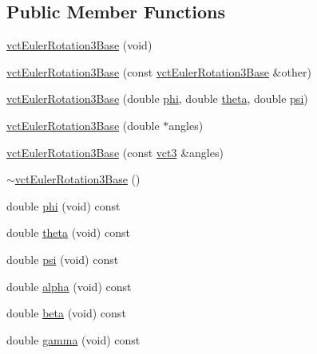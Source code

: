 \subsection*{Public Member Functions}
\begin{DoxyCompactItemize}
\item 
\hyperlink{classvct_euler_rotation3_base_ae1f9e5e19f7cdcc730e654a6fb6e8eac}{vct\-Euler\-Rotation3\-Base} (void)
\item 
\hyperlink{classvct_euler_rotation3_base_addcff20799832d83b777e33cd7291da4}{vct\-Euler\-Rotation3\-Base} (const \hyperlink{classvct_euler_rotation3_base}{vct\-Euler\-Rotation3\-Base} \&other)
\item 
\hyperlink{classvct_euler_rotation3_base_a0c71f3b2255a2eb4027161881b88771a}{vct\-Euler\-Rotation3\-Base} (double \hyperlink{classvct_euler_rotation3_base_af2e807e479e504cd47c58b308f25317c}{phi}, double \hyperlink{classvct_euler_rotation3_base_ac74e14d30f7d2077068e2f4b5c7219b1}{theta}, double \hyperlink{classvct_euler_rotation3_base_aeee06e33924728dd210644a390f86522}{psi})
\item 
\hyperlink{classvct_euler_rotation3_base_a32cfaad298a332212b8d8f0ac430eb90}{vct\-Euler\-Rotation3\-Base} (double $\ast$angles)
\item 
\hyperlink{classvct_euler_rotation3_base_a3b85dbf47bf87636f63a1094c3789307}{vct\-Euler\-Rotation3\-Base} (const \hyperlink{vct_fixed_size_vector_types_8h_a3af82acdbf4eeb73c551909240b106ea}{vct3} \&angles)
\item 
\hyperlink{classvct_euler_rotation3_base_ae1b3d729b1a71349c469fe2ba0131745}{$\sim$vct\-Euler\-Rotation3\-Base} ()
\item 
double \hyperlink{classvct_euler_rotation3_base_af2e807e479e504cd47c58b308f25317c}{phi} (void) const 
\item 
double \hyperlink{classvct_euler_rotation3_base_ac74e14d30f7d2077068e2f4b5c7219b1}{theta} (void) const 
\item 
double \hyperlink{classvct_euler_rotation3_base_aeee06e33924728dd210644a390f86522}{psi} (void) const 
\item 
double \hyperlink{classvct_euler_rotation3_base_ac648a310804247d41cc6d69e958a3f57}{alpha} (void) const 
\item 
double \hyperlink{classvct_euler_rotation3_base_a48cc19ba0de0496bbfdb9b888aee5b6d}{beta} (void) const 
\item 
double \hyperlink{classvct_euler_rotation3_base_a8b3468e75b5aedef2db7bf613969215c}{gamma} (void) const 
\item 

\end{DoxyCompactItemize}
